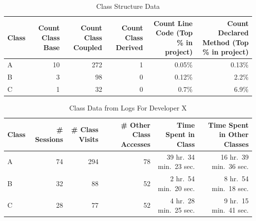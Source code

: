 \begin{table}[!t]
    \renewcommand{\arraystretch}{1.3}
	\centering
	\caption{Class Structure Data}
	\begin{tabular}{lrrrrr}
	\toprule
\textbf{Class} & \textbf{Count Class Base} & \textbf{Count Class Coupled} & \textbf{Count Class Derived} & \textbf{Count Line Code} {(Top \% in project)} & \textbf{Count Declared Method} {(Top \% in project)}\\
\midrule
 A & 10 & 272 & 1 & 0.05\% & 0.13\%\\
 B & 3 & 98 & 0 & 0.12\% & 2.2\%\\
 C & 1 & 32 & 0 & 0.7\% & 6.9\%\\
\bottomrule
	\end{tabular}
	\label{fig:ClassStructureAnalysisData}
\end{table}

\begin{table}[!t]
    \renewcommand{\arraystretch}{1.3}
	\centering
	\caption{Class Data from Logs For Developer X}
	\begin{tabular}{lrrrrr}
	\toprule
\textbf{Class} & \textbf{\# Sessions} & \textbf{\# Class Visits} & \textbf{\# Other Class Accesses} & \textbf{Time Spent in Class} & \textbf{Time Spent in Other Classes}\\
\midrule
A & 74 & 294 & 78 & 39 hr.\ 34 min.\ 23 sec. & 16 hr.\ 39 min.\ 36 sec.\\
B & 32 & 88 & 52 & 2 hr.\ 54 min.\ 20 sec. & 8 hr.\ 54 min.\ 18 sec.\\
C & 28 & 77 & 52 & 4 hr.\ 28 min.\ 25 sec. & 9 hr.\ 15 min.\ 41 sec.\\
\bottomrule
	\end{tabular}
	\label{fig:ClassAnalysisData}
	\vspace*{-3mm}
\end{table}


